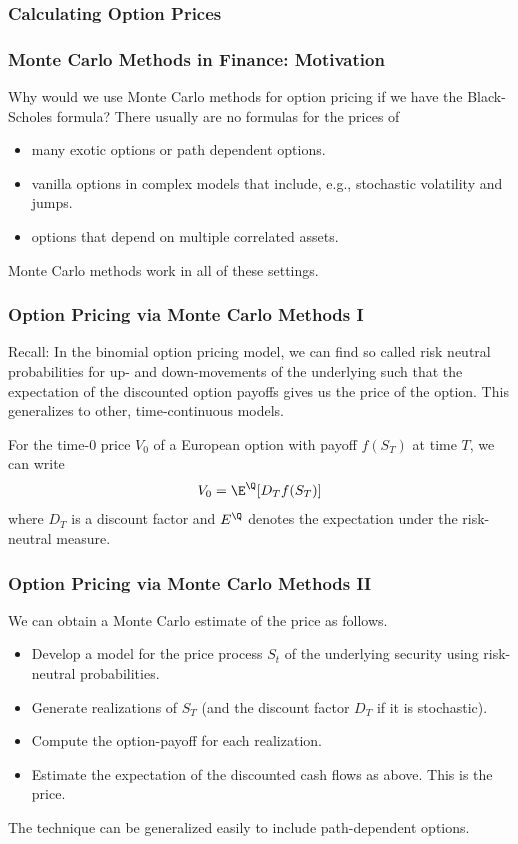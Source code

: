 \subsubsection{Calculating Option Prices}
\begin{frame}[fragile]
\frametitle{Monte Carlo Methods in Finance: Motivation}
Why would we use Monte Carlo methods for option pricing if we have the
Black-Scholes formula? There usually are no formulas for the prices of
\begin{itemize}
  \item many exotic options or path dependent options.
  \item vanilla options in complex models that include, e.g., stochastic
  volatility and jumps.
  \item options that depend on multiple correlated assets.
\end{itemize}
Monte Carlo methods work in all of these settings.
\end{frame}

\begin{frame}[fragile]
\frametitle{Option Pricing via Monte Carlo Methods I}
Recall: In the binomial option pricing model, we can find so
called risk neutral probabilities for up- and down-movements of the underlying
such that the  expectation of the discounted option payoffs gives us the price
of the option. This generalizes to other, time-continuous models.

For the time-$0$ price $V_0$ of a European option with payoff $f(S_T)$ at time
$T$, we can write
\begin{align*}
  V_0 = \E^\mathbb{\Q}[D_T f(S_T)]
\end{align*}
where $D_T$ is a discount factor and $E^\mathbb{\Q}$ denotes the expectation
under the risk-neutral measure.
\end{frame}

\begin{frame}[fragile]
\frametitle{Option Pricing via Monte Carlo Methods II}
We can obtain a Monte Carlo estimate of the price as follows.
\begin{itemize}
  \item Develop a model for the price process $S_t$ of the underlying security
  using risk-neutral probabilities.
  \item Generate realizations of $S_T$ (and the discount factor $D_T$ if it is
  stochastic).
  \item Compute the option-payoff for each realization.
  \item Estimate the expectation of the discounted cash flows as above. This is
  the price.
\end{itemize}
The technique can be generalized easily to include path-dependent options.
\end{frame}


